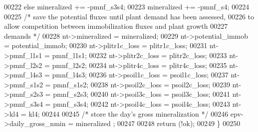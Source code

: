 \begin{DoxyCode}
00222     \textcolor{keywordflow}{else} mineralized += -pmnf\_s3s4;
00223     mineralized += -pmnf\_s4;
00224     
00225     \textcolor{comment}{/* save the potential fluxes until plant demand has been assessed,}
00226 \textcolor{comment}{    to allow competition between immobilization fluxes and plant growth}
00227 \textcolor{comment}{    demands */}
00228     nt->mineralized = mineralized;
00229     nt->potential\_immob = potential\_immob;
00230     nt->plitr1c\_loss = plitr1c\_loss;
00231     nt->pmnf\_l1s1 = pmnf\_l1s1;
00232     nt->plitr2c\_loss = plitr2c\_loss;
00233     nt->pmnf\_l2s2 = pmnf\_l2s2;
00234     nt->plitr4c\_loss = plitr4c\_loss;
00235     nt->pmnf\_l4s3 = pmnf\_l4s3;
00236     nt->psoil1c\_loss = psoil1c\_loss;
00237     nt->pmnf\_s1s2 = pmnf\_s1s2;
00238     nt->psoil2c\_loss = psoil2c\_loss;
00239     nt->pmnf\_s2s3 = pmnf\_s2s3;
00240     nt->psoil3c\_loss = psoil3c\_loss;
00241     nt->pmnf\_s3s4 = pmnf\_s3s4;
00242     nt->psoil4c\_loss = psoil4c\_loss;
00243     nt->kl4 = kl4;
00244     
00245     \textcolor{comment}{/* store the day's gross mineralization */}
00246     epv->daily\_gross\_nmin = mineralized ;
00247     
00248     \textcolor{keywordflow}{return} (!ok);
00249 \}
00250 
\end{DoxyCode}
